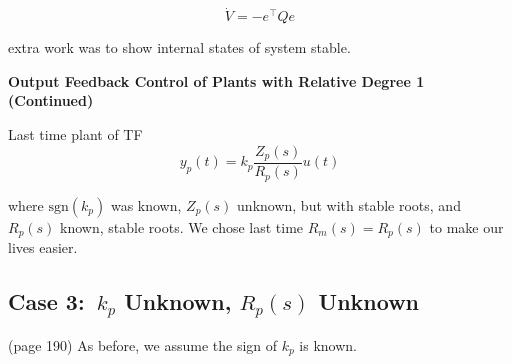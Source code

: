 \begin{equation*}
  \dot{V}=-e^{\top}Qe
\end{equation*}

extra work was to show internal states of system stable.

\textbf{Output Feedback Control of Plants with Relative Degree 1 (Continued)}

Last time plant of TF
\begin{equation*}
  y_{p}(t)=k_{p}\frac{Z_{p}(s)}{R_{p}(s)}u(t)
\end{equation*}

where $\text{sgn}(k_{p})$ was known,  $Z_{p}(s)$ unknown, but with stable roots, and $R_{p}(s)$ known, stable roots.
We chose last time $R_{m}(s)=R_{p}(s)$ to make our lives easier.

\subsection{Case 3:\ \texorpdfstring{$k_{p}$}{kp} Unknown, \texorpdfstring{$R_{p}(s)$}{Rp(s)} Unknown}

(page 190) As before, we assume the sign of $k_{p}$ is known.

